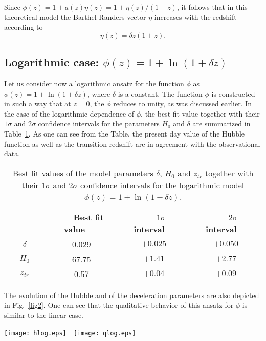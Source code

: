 \documentclass[aps,superscriptaddress, showpacs,preprintnumbers, superscriptaddress, nofootinbibt,twocolumn]{revtex4-2}
\def\be{\begin{equation}}
\def\ee{\end{equation}}
\begin{document}
Since $\phi (z)=1+a(z)\eta (z)=1+\eta (z)/(1+z)$, it follows that in this theoretical model the Barthel-Randers vector $\eta$ increases with the redshift according to
\be
\eta (z)=\delta z\left(1+z\right).
\ee

\subsection{Logarithmic case: $\phi(z)=1+\ln (1+\delta z)$}

Let us consider now a logarithmic ansatz for the function $\phi$ as $\phi (z)=1+\ln(1+\delta z)$, where $\delta $ is a constant. The function $\phi$  is constructed in such a way that at $z=0$, the $\phi$ reduces to unity, as was discussed earlier. In the case of the logarithmic dependence of $\phi$, the best fit value together with their $1\sigma$ and $2\sigma$ confidence intervals for the parameters $H_0$ and $\delta$ are summarized in Table~\ref{tab2}. As one can see from the Table, the present day value of the Hubble function as well as the transition redshift are in agreement with the observational data.

\begin{table}[h!]
	\begin{center}
		\begin{tabular}{|c||c|c|c|}
			\hline
			~~~~~~~&~~~Best fit value~~~&~~~$1\sigma$~interval~~~&~~~$2\sigma$~interval~~~\\
			\hline%
			$\delta $&0.029&$\pm0.025$&$\pm0.050$\\
			\hline
			$H_0$&67.75&$\pm1.41$&$\pm2.77$\\
			\hline
				$z_{tr}$&0.57&$\pm0.04$&$\pm0.09$\\
			\hline
		\end{tabular}
	\end{center}
	\caption{Best fit values of the model parameters $\delta$, $H_0$ and $z_{tr} $ together with their $1\sigma$ and $2\sigma$ confidence intervals for the logarithmic model $\phi (z)=1+\ln(1+\delta z)$.\label{tab2}}
\end{table}

The evolution of the Hubble and of the deceleration parameters are also depicted in Fig.~\ref{fig2}. One can see that the qualitative behavior of this ansatz for $\phi$ is similar to the linear case.

\begin{figure*}[htbp]
	\texttt{[image: hlog.eps]}~~\texttt{[image: qlog.eps]}
	\caption{The evolution of the Hubble parameter (left panel) and of the deceleration parameter (right panel) as a function of the redshift $z$ in the logarithmic case $\phi(z)=1+\ln(1+\delta z)$. The dashed, dotted and dot-dashed curves correspond to the best fit and lower/higher $2\sigma$ extreme values of the parameter $\delta $ in Table~\ref{tab2}. The red solid line corresponds to the $\Lambda$CDM model, and the error bars represent the  observational data.}\label{fig2}
\end{figure*}
\end{document}
